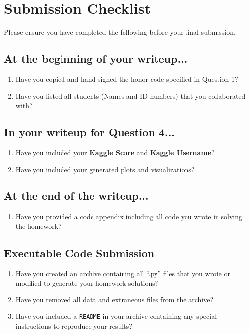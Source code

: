 \documentclass[11pt]{article}
\begin{document}
\pagebreak

\newpage


\newpage


\newpage


\newpage


\newpage
\section*{Submission Checklist}
Please ensure you have completed the following before your final submission.
\subsection*{At the beginning of your writeup...}
\begin{enumerate}
    \item Have you copied and hand-signed the honor code specified in Question 1?
    \item Have you listed all students (Names and ID numbers) that you collaborated with?
\end{enumerate}
\subsection*{In your writeup for Question 4...}
\begin{enumerate}
\item Have you included your \textbf{Kaggle Score} and \textbf{Kaggle Username}?
\item Have you included your generated plots and visualizations?


\end{enumerate}
\subsection*{At the end of the writeup...}
\begin{enumerate}

\item Have you provided a code appendix including all code you wrote in solving the homework?
\end{enumerate}
\subsection*{Executable Code Submission}
\begin{enumerate}
    \item Have you created an archive containing all ``.py'' files that you wrote or modified to generate your homework solutions?
    \item Have you removed all data and extraneous files from the archive?
    \item Have you included a \texttt{README} in your archive containing any special instructions to reproduce your results?
\end{enumerate}
\end{document}
